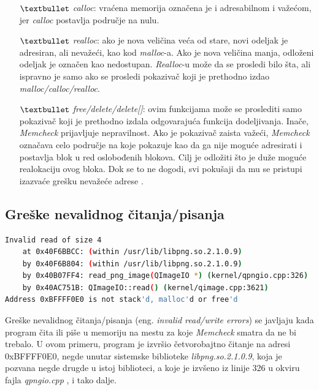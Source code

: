 \documentclass[12pt,oneside]{memoir}
\theoremstyle{plain}
\theoremstyle{definition}
\begin{document}
\begin{itemize}
\begin{itemize}
	\item[$\textbullet$] \textit{calloc}: vraćena memorija označena je i adresabilnom i važećom, jer \textit{calloc} postavlja područje na nulu.
	\item[$\textbullet$] \textit{realloc}: ako je nova veličina veća od stare, novi odeljak je adresiran, ali nevažeći, kao kod \textit{malloc}-a. Ako je nova veličina manja, odloženi odeljak je označen kao nedostupan. \textit{Realloc}-u može da se prosledi bilo šta, ali ispravno je samo ako se prosledi pokazivač koji je prethodno izdao \textit{malloc/calloc/realloc}.
	\item[$\textbullet$] \textit{free/delete/delete[]}: ovim funkcijama može se proslediti samo pokazivač koji je prethodno izdala odgovarajuća funkcija dodeljivanja. Inače, \textit{Memcheck} prijavljuje nepravilnost. Ako je pokazivač zaista važeći, \textit{Memcheck} označava celo područje na koje pokazuje kao da ga nije moguće adresirati i postavlja blok u red oslobođenih blokova. Cilj je odložiti što je duže moguće realokaciju ovog bloka. Dok se to ne dogodi, svi pokušaji da mu se pristupi izazvaće grešku nevažeće adrese \cite{ValgrindDOC}. 
	\end{itemize}
\end{itemize}

\subsection{Greške nevalidnog čitanja/pisanja}

\begin{lstlisting}[style=terminal,caption={Primer ispisa greške nevalidnog čitanja \cite{Memcheck}}, label={lst:slika2.3},language={bash}]   
Invalid read of size 4
    at 0x40F6BBCC: (within /usr/lib/libpng.so.2.1.0.9)
    by 0x40F6B804: (within /usr/lib/libpng.so.2.1.0.9)
    by 0x40B07FF4: read_png_image(QImageIO *) (kernel/qpngio.cpp:326)
    by 0x40AC751B: QImageIO::read() (kernel/qimage.cpp:3621)
Address 0xBFFFF0E0 is not stack'd, malloc'd or free'd
\end{lstlisting}

Greške nevalidnog čitanja/pisanja (eng. \textit{invalid read/write errors}) se javljaju kada program čita ili piše u memoriju na mestu za koje \textit{Memcheck} smatra da ne bi trebalo. U ovom primeru, program je izvršio četvorobajtno čitanje na adresi 0xBFFFF0E0, negde unutar sistemske biblioteke \textit{libpng.so.2.1.0.9}, koja je pozvana negde drugde u istoj biblioteci, a koje je izvšeno iz linije 326 u okviru fajla \textit{qpngio.cpp} , i tako dalje.
\end{document}
